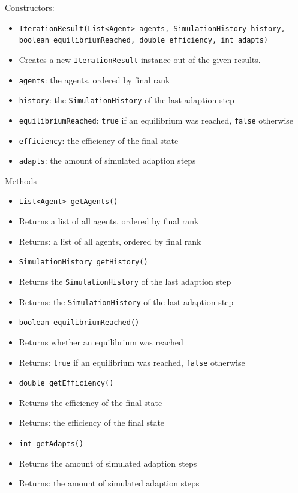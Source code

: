 \documentclass[parskip=full,11pt]{scrartcl}
\begin{document}
Constructors:
\begin{itemize}\itemsep -10pt
\item \texttt{IterationResult(List<Agent> agents, SimulationHistory history, boolean equilibriumReached, double efficiency, int adapts)}
\item[] Creates a new \texttt{IterationResult} instance out of the given results.
\item[] \texttt{agents}: the agents, ordered by final rank
\item[] \texttt{history}: the \texttt{SimulationHistory} of the last adaption step
\item[] \texttt{equilibriumReached}: \texttt{true} if an equilibrium was reached, \texttt{false} otherwise
\item[] \texttt{efficiency}: the efficiency of the final state
\item[] \texttt{adapts}: the amount of simulated adaption steps
\end{itemize}

Methods
\begin{itemize}\itemsep -10pt
\item \texttt{List<Agent> getAgents()}
\item[] Returns a list of all agents, ordered by final rank
\item[] Returns: a list of all agents, ordered by final rank

\item \texttt{SimulationHistory getHistory()}
\item[] Returns the \texttt{SimulationHistory} of the last adaption step
\item[] Returns: the \texttt{SimulationHistory} of the last adaption step

\item \texttt{boolean equilibriumReached()}
\item[] Returns whether an equilibrium was reached
\item[] Returns: \texttt{true} if an equilibrium was reached, \texttt{false} otherwise

\item \texttt{double getEfficiency()}
\item[] Returns the efficiency of the final state
\item[] Returns: the efficiency of the final state

\item \texttt{int getAdapts()}
\item[] Returns the amount of simulated adaption steps
\item[] Returns: the amount of simulated adaption steps
\end{itemize}
\end{document}
